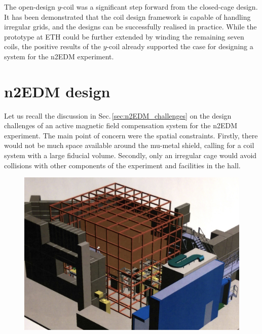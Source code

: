 

The open-design $y$-coil was a significant step forward from the closed-cage design.
It has been demonstrated that the coil design framework is capable of handling irregular grids, and the designs can be successfully realised in practice.
While the prototype at ETH could be further extended by winding the remaining seven coils, the positive results of the $y$-coil already supported the case for designing a system for the n2EDM experiment.




\section{n2EDM design}
Let us recall the discussion in Sec.\,\ref{sec:n2EDM_challenges} on the design challenges of an active magnetic field compensation system for the n2EDM experiment.
The main point of concern were the spatial constraints.
Firstly, there would not be much space available around the mu-metal shield, calling for a coil system with a large fiducial volume.
Secondly, only an irregular cage would avoid collisions with other components of the experiment and facilities in the hall.

\begin{figure}
  \centering
  \includegraphics[width=\linewidth]{gfx/prototype/n2EDM_SFC_3D.jpg}
  \caption{}\label{fig:n2EDM_design_3d}
\end{figure}

